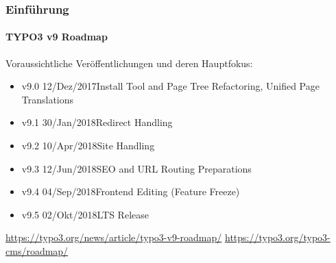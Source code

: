 \begin{frame}[fragile]
	\frametitle{Einführung}
	\framesubtitle{TYPO3 v9 Roadmap}

	Voraussichtliche Veröffentlichungen und deren Hauptfokus:

	\begin{itemize}

		\item v9.0 \tabto{1.1cm}12/Dez/2017\tabto{3.4cm}Install Tool and Page Tree Refactoring,\newline
			\tabto{3.4cm}Unified Page Translations
		\item v9.1 \tabto{1.1cm}30/Jan/2018\tabto{3.4cm}Redirect Handling
		\item v9.2 \tabto{1.1cm}10/Apr/2018\tabto{3.4cm}Site Handling
		\item
			\begingroup
				\color{typo3orange}
					v9.3 \tabto{1.1cm}12/Jun/2018\tabto{3.4cm}SEO and URL Routing Preparations
			\endgroup
		\item v9.4 \tabto{1.1cm}04/Sep/2018\tabto{3.4cm}Frontend Editing (Feature Freeze)
		\item v9.5 \tabto{1.1cm}02/Okt/2018\tabto{3.4cm}LTS Release

	\end{itemize}

	\smaller
		\url{https://typo3.org/news/article/typo3-v9-roadmap/}\newline
		\url{https://typo3.org/typo3-cms/roadmap/}
	\normalsize

\end{frame}

